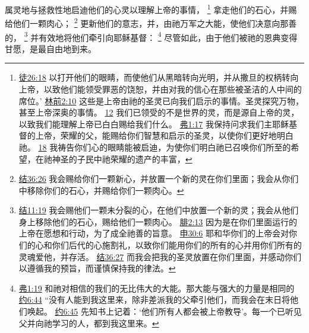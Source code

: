 \documentclass[12pt, a4paper, oneside]{ctexart}
\begin{document}
	属灵地与拯救性地启迪他们的心灵以理解上帝的事情，
	\footnote {
		\href{https://biblehub.com/acts/26-18.htm}{徒26:18} 以打开他们的眼睛，而使他们从黑暗转向光明，并从撒旦的权柄转向上帝，以致他们能领受罪恶的饶恕，并由对我的信心在那些被圣洁的人中间的席位。’
		\href{https://biblehub.com/1_corinthians/2-10.htm}{林前2:10} 这些是上帝由祂的圣灵已向我们启示的事情。圣灵探究万物，甚至上帝深奥的事情。
		\href{https://biblehub.com/1_corinthians/2-12.htm}{12} 我们已领受的不是世界的灵，而是源自上帝的灵，以致我们能理解上帝已白白赐给我们什么。
		\href{https://biblehub.com/ephesians/1-17.htm}{弗1:17} 我保持问求我们主耶稣基督的上帝，荣耀的父，能赐给你们智慧和启示的圣灵，以使你们更好地明白祂。
		\href{https://biblehub.com/ephesians/1-18.htm}{18} 我祷告你们心的眼睛能被启迪，为使你们明白祂已召唤你们所至的希望，在祂神圣的子民中祂荣耀的遗产的丰富，
	}
	拿走他们的石心，并赐给他们一颗肉心；
	\footnote {
		\href{https://biblehub.com/ezekiel/36-26.htm}{结36:26} 我会赐给你们一颗新心，并放置一个新的灵在你们里面；我会从你们中移除你们的石心，并赐给你们一颗肉心。
	}
	更新他们的意志，并，由祂万军之大能，使他们决意向那善的，
	\footnote {
		\href{https://biblehub.com/ezekiel/11-19.htm}{结11:19} 我会赐他们一颗未分裂的心，在他们中放置一个新的灵；我会从他们身上移除他们的石心，赐给他们一颗肉心。
		\href{https://biblehub.com/philippians/2-13.htm}{腓2:13} 因为是在你们里面运行的上帝在愿想和行动，为了成全祂善的旨意。
		\href{https://biblehub.com/deuteronomy/30-6.htm}{申30:6} 耶和华你们的上帝会对你们的心和你们后代的心施割礼，以致你们能用你们的所有的心并用你们所有的灵魂爱他，并存活。
		\href{https://biblehub.com/ezekiel/36-27.htm}{结36:27} 而我会把我的圣灵放置在你们里面，并感动你们以遵循我的预旨，而谨慎保持我的律法。
	}
	并有效地将他们牵引向耶稣基督：
	\footnote {
		\href{https://biblehub.com/ephesians/1-19.htm}{弗1:19} 和祂对相信的我们的无比伟大的大能。那大能与强大的力量是相同的
		\href{https://biblehub.com/john/6-44.htm}{约6:44} “没有人能到我这里来，除非差派我的父牵引他们，而我会在末日将他们唤起。
		\href{https://biblehub.com/john/6-45.htm}{约6:45} 先知书上记着：‘他们所有人都会被上帝教导’。每一个已听见父并向祂学习的人，都到我这里来。
	}
	尽管如此，由于他们被祂的恩典变得甘愿，是最自由地到来。
\end{document}
